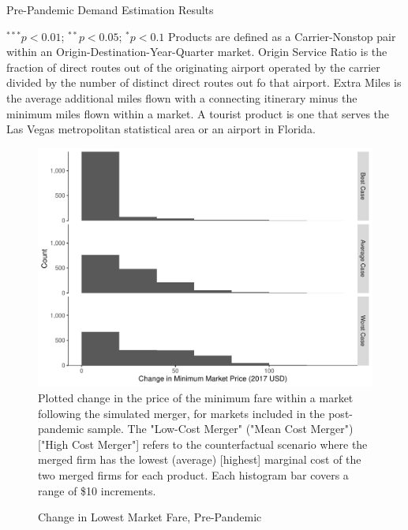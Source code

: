 \documentclass{article}
\begin{document}
\begin{appendices}
	
	\begin{table}
		\caption{Pre-Pandemic Demand Estimation Results}
		\label{tab:Results_PrePandemic}
		
		\footnotesize{$^{***}p<0.01$; $^{**}p<0.05$; $^{*}p<0.1$ Products are defined as a Carrier-Nonstop pair within an Origin-Destination-Year-Quarter market. Origin Service Ratio is the fraction of direct routes out of the originating airport operated by the carrier divided by the number of distinct direct routes out fo that airport. Extra Miles is the average additional miles flown with a connecting itinerary minus the minimum miles flown within a market.  A tourist product is one that serves the Las Vegas metropolitan statistical area or an airport in Florida.}
	\end{table}
	
	
	\begin{figure}
		\caption{Change in Lowest Market Fare, Pre-Pandemic}
		\label{fig:LowestMarketChange_Pre}
		\includegraphics[width = \linewidth]{PrePandemic_Merger_Change_MinimumFare}
		\footnotesize{Plotted change in the price of the minimum fare within a market following the simulated merger, for markets included in the post-pandemic sample. The "Low-Cost Merger" ("Mean Cost Merger") ["High Cost Merger"] refers to the counterfactual scenario where the merged firm has the lowest (average) [highest] marginal cost of the two merged firms for each product. Each histogram bar covers a range of \$10 increments.}
	\end{figure}
	
	\FloatBarrier

\end{appendices}
\end{document}
